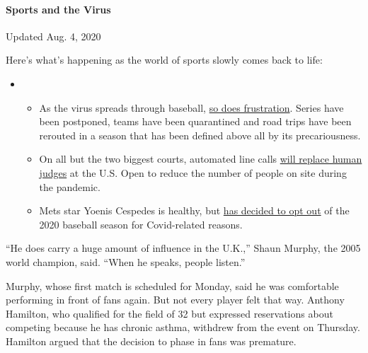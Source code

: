 \hypertarget{sports-and-the-virus}{%
\paragraph{Sports and the Virus}\label{sports-and-the-virus}}

Updated Aug. 4, 2020

Here's what's happening as the world of sports slowly comes back to
life:

\begin{itemize}
\item
  \begin{itemize}
  \tightlist
  \item
    As the virus spreads through baseball,
    \href{https://www.nytimes.com/2020/08/03/sports/baseball/mlb-coronavirus-outbreak.html?action=click\&pgtype=Article\&state=default\&region=MAIN_CONTENT_2\&context=storylines_keepup}{so
    does frustration}. Series have been postponed, teams have been
    quarantined and road trips have been rerouted in a season that has
    been defined above all by its precariousness.
  \item
    On all but the two biggest courts, automated line calls
    \href{https://www.nytimes.com/2020/08/03/sports/tennis/us-open-hawkeye-line-judges.html?action=click\&pgtype=Article\&state=default\&region=MAIN_CONTENT_2\&context=storylines_keepup}{will
    replace human judges} at the U.S. Open to reduce the number of
    people on site during the pandemic.
  \item
    Mets star Yoenis Cespedes is healthy, but
    \href{https://www.nytimes.com/2020/08/02/sports/baseball/Yoenis-cespedes-opt-out-rule.html?action=click\&pgtype=Article\&state=default\&region=MAIN_CONTENT_2\&context=storylines_keepup}{has
    decided to opt out} of the 2020 baseball season for Covid-related
    reasons.
  \end{itemize}
\end{itemize}

``He does carry a huge amount of influence in the U.K.,'' Shaun Murphy,
the 2005 world champion, said. ``When he speaks, people listen.''

Murphy, whose first match is scheduled for Monday, said he was
comfortable performing in front of fans again. But not every player felt
that way. Anthony Hamilton, who qualified for the field of 32 but
expressed reservations about competing because he has chronic asthma,
withdrew from the event on Thursday. Hamilton argued that the decision
to phase in fans was premature.

